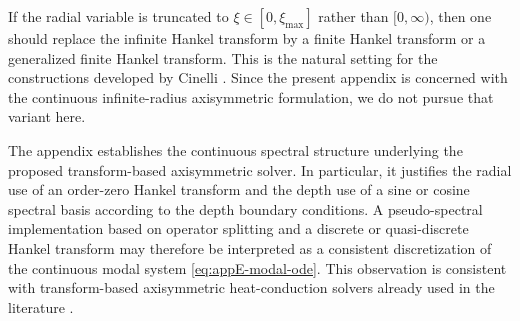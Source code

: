 \begin{remark}
    If the radial variable is truncated to \(\xi\in[0,\xi_{\max}]\) rather than
    \([0,\infty)\), then one should replace the infinite Hankel transform by a
    finite Hankel transform or a generalized finite Hankel transform. This is the
    natural setting for the constructions developed by Cinelli
    \cite{Cinelli_1965}. Since the present appendix is concerned with the
    continuous infinite-radius axisymmetric formulation, we do not pursue that
    variant here.
\end{remark}

\begin{remark}
    The appendix establishes the continuous spectral structure underlying the
    proposed transform-based axisymmetric solver. In particular, it justifies the
    radial use of an order-zero Hankel transform and the depth use of a sine or
    cosine spectral basis according to the depth boundary conditions.
    A pseudo-spectral implementation based on operator splitting and a discrete or
    quasi-discrete Hankel transform may therefore be interpreted as a consistent
    discretization of the continuous modal system
    \eqref{eq:appE-modal-ode}. This observation is consistent with transform-based
    axisymmetric heat-conduction solvers already used in the literature
    \cite{Rogers_2012,Kunga_2021}.
\end{remark}

